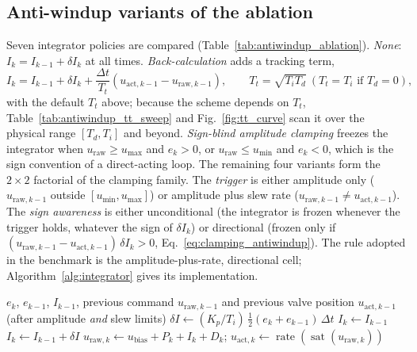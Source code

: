 \subsection{Anti-windup variants of the ablation}
\label{subsec:aw_variants}
Seven integrator policies are compared (Table~\ref{tab:antiwindup_ablation}). \emph{None}: $I_k = I_{k-1} + \delta I_k$ at all times. \emph{Back-calculation} \cite{astrom1989windup, galeani2009tutorial} adds a tracking term,
\begin{equation}
    I_k = I_{k-1} + \delta I_k + \frac{\Delta t}{T_t}\left(u_{\text{act},k-1} - u_{\text{raw},k-1}\right), \qquad T_t = \sqrt{T_i T_d}\ (T_t = T_i \text{ if } T_d = 0),
    \label{eq:back_calculation}
\end{equation}
with the default $T_t$ above; because the scheme depends on $T_t$, Table~\ref{tab:antiwindup_tt_sweep} and Fig.~\ref{fig:tt_curve} scan it over the physical range $[T_d, T_i]$ and beyond. \emph{Sign-blind amplitude clamping} freezes the integrator when $u_{\text{raw}} \ge u_{\max}$ and $e_k > 0$, or $u_{\text{raw}} \le u_{\min}$ and $e_k < 0$, which is the sign convention of a direct-acting loop. The remaining four variants form the $2\times 2$ factorial of the clamping family. The \emph{trigger} is either amplitude only ($u_{\text{raw},k-1}$ outside $[u_{\min}, u_{\max}]$) or amplitude plus slew rate ($u_{\text{raw},k-1} \ne u_{\text{act},k-1}$). The \emph{sign awareness} is either unconditional (the integrator is frozen whenever the trigger holds, whatever the sign of $\delta I_k$) or directional (frozen only if $(u_{\text{raw},k-1} - u_{\text{act},k-1})\,\delta I_k > 0$, Eq.~\eqref{eq:clamping_antiwindup}). The rule adopted in the benchmark is the amplitude-plus-rate, directional cell; Algorithm~\ref{alg:integrator} gives its implementation.

\begin{algorithm}[t]
\caption{Integrator update with directional amplitude- and rate-aware clamping (one sampling instant, reverse- or direct-acting).}\label{alg:integrator}
\begin{algorithmic}[1]
\Require $e_k$, $e_{k-1}$, $I_{k-1}$, previous command $u_{\text{raw},k-1}$ and previous valve position $u_{\text{act},k-1}$ (after amplitude \emph{and} slew limits)
\State $\delta I \gets (K_p/T_i)\,\tfrac12 (e_k + e_{k-1})\,\Delta t$
    \State $I_k \gets I_{k-1}$ 
\Else
    \State $I_k \gets I_{k-1} + \delta I$
\EndIf
\State $u_{\text{raw},k} \gets u_{\text{bias}} + P_k + I_k + D_k$; \quad $u_{\text{act},k} \gets \operatorname{rate}(\operatorname{sat}(u_{\text{raw},k}))$
\end{algorithmic}
\end{algorithm}

